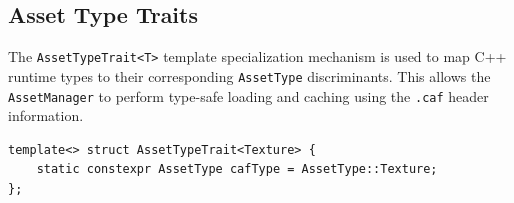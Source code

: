 \subsection{Asset Type Traits}

The \texttt{AssetTypeTrait<T>} template specialization mechanism is used to map 
C++ runtime types to their corresponding \texttt{AssetType} discriminants. This allows 
the \texttt{AssetManager} to perform type-safe loading and caching using the 
\texttt{.caf} header information.

\begin{lstlisting}[caption={AssetTypeTrait specialization}]
template<> struct AssetTypeTrait<Texture> {
    static constexpr AssetType cafType = AssetType::Texture;
};
\end{lstlisting}
